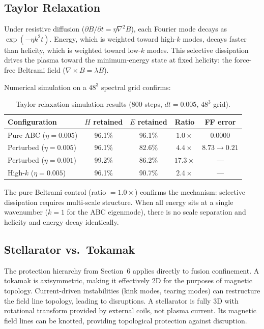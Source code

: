 \documentclass[11pt,a4paper]{article}
\begin{document}
\subsection{Taylor Relaxation}

Under resistive diffusion ($\partial B/\partial t = \eta\nabla^2 B$), each Fourier mode decays as $\exp(-\eta k^2 t)$. Energy, which is weighted toward high-$k$ modes, decays faster than helicity, which is weighted toward low-$k$ modes. This selective dissipation drives the plasma toward the minimum-energy state at fixed helicity: the force-free Beltrami field ($\nabla\times B = \lambda B$).

Numerical simulation on a $48^3$ spectral grid confirms:

\begin{table}[h]
\centering
\begin{tabular}{lcccc}
\toprule
\textbf{Configuration} & \textbf{$H$ retained} & \textbf{$E$ retained} & \textbf{Ratio} & \textbf{FF error} \\
\midrule
Pure ABC ($\eta=0.005$) & 96.1\% & 96.1\% & $1.0\times$ & 0.0000 \\
Perturbed ($\eta=0.005$) & 96.1\% & 82.6\% & $4.4\times$ & $8.73 \to 0.21$ \\
Perturbed ($\eta=0.001$) & 99.2\% & 86.2\% & $17.3\times$ & --- \\
High-$k$ ($\eta=0.005$) & 96.1\% & 90.7\% & $2.4\times$ & --- \\
\bottomrule
\end{tabular}
\caption{Taylor relaxation simulation results (800 steps, $dt=0.005$, $48^3$ grid).}
\label{tab:taylor}
\end{table}

The pure Beltrami control (ratio $= 1.0\times$) confirms the mechanism: selective dissipation requires multi-scale structure. When all energy sits at a single wavenumber ($k=1$ for the ABC eigenmode), there is no scale separation and helicity and energy decay identically.

\subsection{Stellarator vs.\ Tokamak}

The protection hierarchy from Section~6 applies directly to fusion confinement. A tokamak is axisymmetric, making it effectively 2D for the purposes of magnetic topology. Current-driven instabilities (kink modes, tearing modes) can restructure the field line topology, leading to disruptions. A stellarator is fully 3D with rotational transform provided by external coils, not plasma current. Its magnetic field lines can be knotted, providing topological protection against disruption.
\end{document}
